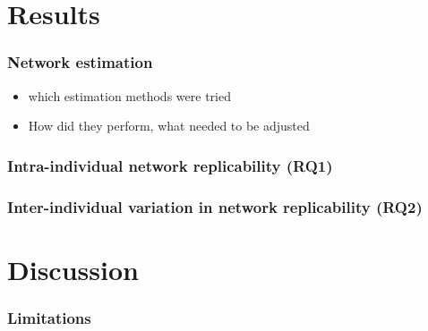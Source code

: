 \documentclass[
  english,
  man]{apa6}
\begin{document}
\hypertarget{results}{%
\section{Results}\label{results}}

\hypertarget{network-estimation-1}{%
\subsubsection{Network estimation}\label{network-estimation-1}}

\begin{itemize}
\item
  which estimation methods were tried
\item
  How did they perform, what needed to be adjusted
\end{itemize}

\hypertarget{intra-individual-network-replicability-rq1}{%
\subsubsection{Intra-individual network replicability (RQ1)}\label{intra-individual-network-replicability-rq1}}

\hypertarget{inter-individual-variation-in-network-replicability-rq2}{%
\subsubsection{Inter-individual variation in network replicability (RQ2)}\label{inter-individual-variation-in-network-replicability-rq2}}

\hypertarget{discussion}{%
\section{Discussion}\label{discussion}}

\hypertarget{limitations}{%
\subsubsection{Limitations}\label{limitations}}
\end{document}
